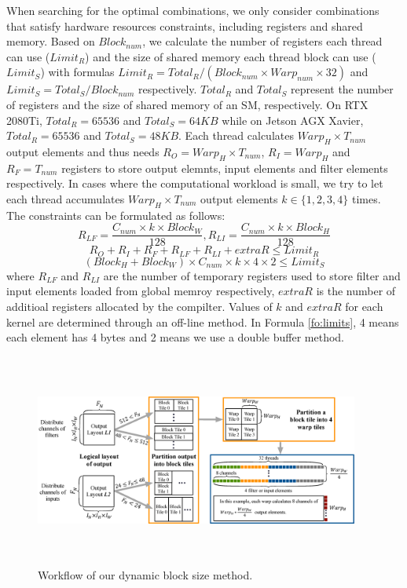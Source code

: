 When searching for the optimal combinations, we only consider combinations that satisfy hardware resources constraints, including registers and shared memory.
Based on $Block_{num}$, we calculate the number of registers each thread can use ($Limit_R$) and the size of shared memory each thread block can use ($Limit_S$) with formulas $Limit_R=Total_R/(Block_{num}\times Warp_{num} \times 32)$ and $Limit_S=Total_S/Block_{num}$ respectively. $Total_R$ and $Total_S$ represent the number of registers and the size of shared memory of an SM, respectively. On RTX 2080Ti, $Total_R=65536$ and $Total_S=64KB$ while  on Jetson AGX Xavier, $Total_R=65536$ and $Total_S=48KB$.
Each thread calculates $Warp_H \times T_{num}$ output elements and thus needs $R_O=Warp_H \times T_{num}$, $R_I=Warp_H$ and $R_F=T_{num}$ registers to store output elemnts, input elements and filter elements respectively.
In cases where the computational workload is small, we try to let each thread accumulates $Warp_H \times T_{num}$ output elements $k \in \{1,2,3,4\}$ times.
The constraints can be formulated as follows:
\begin{equation}\nonumber
R_{LF}=\frac{C_{num} \times k \times Block_W}{128},R_{LI}=\frac{C_{num} \times k \times Block_H}{128}
\end{equation}
\begin{equation}
    \label{fo:limitr}
R_O+R_I+R_F+R_{LF}+R_{LI}+extraR \leq Limit_R
\end{equation}
\begin{equation}
    \label{fo:limits}
(Block_H+Block_W)\times C_{num} \times k \times 4 \times 2 \leq Limit_S
\end{equation}
where $R_{LF}$ and $R_{LI}$ are the number of temporary registers used to store filter and input elements loaded from global memroy respectively, $extraR$ is the number of additioal registers allocated by the compilter. Values of $k$ and $extraR$ for each kernel are determined through an off-line method. In Formula \ref{fo:limits}, 4 means each element has 4 bytes and 2 means we use a double buffer method.
\begin{figure}
	\centering
    \includegraphics[width=0.95\textwidth,height=7cm]{./figure/pwworkflow.eps}
    \caption{Workflow of our dynamic block size method.} \label{fig:pwworkflow}
\end{figure}
